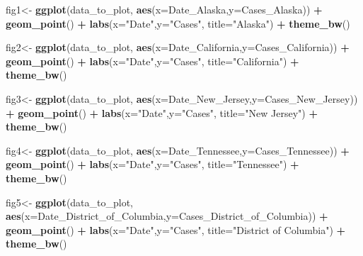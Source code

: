 \documentclass[
]{article}
\newenvironment{Shaded}{\begin{snugshade}}{\end{snugshade}}
\newcommand{\AttributeTok}[1]{\textcolor[rgb]{0.13,0.29,0.53}{#1}}
\newcommand{\FunctionTok}[1]{\textcolor[rgb]{0.13,0.29,0.53}{\textbf{#1}}}
\newcommand{\NormalTok}[1]{#1}
\newcommand{\OtherTok}[1]{\textcolor[rgb]{0.56,0.35,0.01}{#1}}
\newcommand{\SpecialCharTok}[1]{\textcolor[rgb]{0.81,0.36,0.00}{\textbf{#1}}}
\newcommand{\StringTok}[1]{\textcolor[rgb]{0.31,0.60,0.02}{#1}}
\begin{document}
\begin{Shaded}
\begin{Highlighting}[]
\NormalTok{fig1}\OtherTok{\textless{}{-}} \FunctionTok{ggplot}\NormalTok{(data\_to\_plot, }\FunctionTok{aes}\NormalTok{(}\AttributeTok{x=}\NormalTok{Date\_Alaska,}\AttributeTok{y=}\NormalTok{Cases\_Alaska)) }\SpecialCharTok{+}
  \FunctionTok{geom\_point}\NormalTok{() }\SpecialCharTok{+} \FunctionTok{labs}\NormalTok{(}\AttributeTok{x=}\StringTok{"Date"}\NormalTok{,}\AttributeTok{y=}\StringTok{"Cases"}\NormalTok{, }\AttributeTok{title=}\StringTok{"Alaska"}\NormalTok{) }\SpecialCharTok{+} \FunctionTok{theme\_bw}\NormalTok{()}

\NormalTok{fig2}\OtherTok{\textless{}{-}} \FunctionTok{ggplot}\NormalTok{(data\_to\_plot, }\FunctionTok{aes}\NormalTok{(}\AttributeTok{x=}\NormalTok{Date\_California,}\AttributeTok{y=}\NormalTok{Cases\_California)) }\SpecialCharTok{+}
  \FunctionTok{geom\_point}\NormalTok{() }\SpecialCharTok{+} \FunctionTok{labs}\NormalTok{(}\AttributeTok{x=}\StringTok{"Date"}\NormalTok{,}\AttributeTok{y=}\StringTok{"Cases"}\NormalTok{, }\AttributeTok{title=}\StringTok{"California"}\NormalTok{) }\SpecialCharTok{+} \FunctionTok{theme\_bw}\NormalTok{()}

\NormalTok{fig3}\OtherTok{\textless{}{-}} \FunctionTok{ggplot}\NormalTok{(data\_to\_plot, }\FunctionTok{aes}\NormalTok{(}\AttributeTok{x=}\NormalTok{Date\_New\_Jersey,}\AttributeTok{y=}\NormalTok{Cases\_New\_Jersey)) }\SpecialCharTok{+}
  \FunctionTok{geom\_point}\NormalTok{() }\SpecialCharTok{+} \FunctionTok{labs}\NormalTok{(}\AttributeTok{x=}\StringTok{"Date"}\NormalTok{,}\AttributeTok{y=}\StringTok{"Cases"}\NormalTok{, }\AttributeTok{title=}\StringTok{"New Jersey"}\NormalTok{) }\SpecialCharTok{+} \FunctionTok{theme\_bw}\NormalTok{()}

\NormalTok{fig4}\OtherTok{\textless{}{-}} \FunctionTok{ggplot}\NormalTok{(data\_to\_plot, }\FunctionTok{aes}\NormalTok{(}\AttributeTok{x=}\NormalTok{Date\_Tennessee,}\AttributeTok{y=}\NormalTok{Cases\_Tennessee)) }\SpecialCharTok{+}
  \FunctionTok{geom\_point}\NormalTok{() }\SpecialCharTok{+} \FunctionTok{labs}\NormalTok{(}\AttributeTok{x=}\StringTok{"Date"}\NormalTok{,}\AttributeTok{y=}\StringTok{"Cases"}\NormalTok{, }\AttributeTok{title=}\StringTok{"Tennessee"}\NormalTok{) }\SpecialCharTok{+} \FunctionTok{theme\_bw}\NormalTok{()}

\NormalTok{fig5}\OtherTok{\textless{}{-}} \FunctionTok{ggplot}\NormalTok{(data\_to\_plot, }\FunctionTok{aes}\NormalTok{(}\AttributeTok{x=}\NormalTok{Date\_District\_of\_Columbia,}\AttributeTok{y=}\NormalTok{Cases\_District\_of\_Columbia)) }\SpecialCharTok{+}
  \FunctionTok{geom\_point}\NormalTok{() }\SpecialCharTok{+} \FunctionTok{labs}\NormalTok{(}\AttributeTok{x=}\StringTok{"Date"}\NormalTok{,}\AttributeTok{y=}\StringTok{"Cases"}\NormalTok{, }\AttributeTok{title=}\StringTok{"District of Columbia"}\NormalTok{) }\SpecialCharTok{+} \FunctionTok{theme\_bw}\NormalTok{()}


\end{Highlighting}
\end{Shaded}
\end{document}

